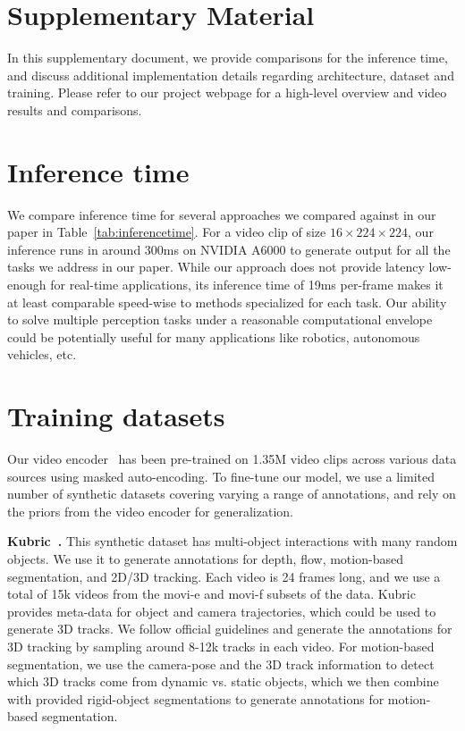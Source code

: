 \clearpage
\section*{\huge Supplementary Material}
\setcounter{page}{1}
\setcounter{section}{0}
\setcounter{table}{0}

In this supplementary document, we provide comparisons for the inference time, and discuss additional implementation details regarding architecture, dataset and training.
Please refer to our project webpage for a high-level overview and video results and comparisons.

\section{Inference time}
We compare inference time for several approaches we compared against in our paper in Table~\ref{tab:inferencetime}.
For a video clip of size $16\times224\times224$, our inference runs in around 300ms on NVIDIA A6000 to generate output for all the tasks we address in our paper.
While our approach does not provide latency low-enough for real-time applications, its inference time of 19ms per-frame makes it at least comparable speed-wise to methods specialized for each task.
Our ability to solve multiple perception tasks under a reasonable computational envelope could be potentially useful for many applications like robotics, autonomous vehicles, etc.

\section{Training datasets}
Our video encoder~\cite{wang2023videomaev2} has been pre-trained on 1.35M video clips across various data sources using masked auto-encoding.
To fine-tune our model, we use a limited number of synthetic datasets covering varying a range of annotations, and rely on the priors from the video encoder for generalization.

\noindent
\textbf{Kubric~\cite{greff2022kubric}.}
This synthetic dataset has multi-object interactions with many random objects.
We use it to generate annotations for depth, flow, motion-based segmentation, and 2D/3D tracking.
Each video is 24 frames long, and we use a total of 15k videos from the movi-e and movi-f subsets of the data.
Kubric provides meta-data for object and camera trajectories, which could be used to generate 3D tracks.
We follow official guidelines and generate the annotations for 3D tracking by sampling around 8-12k tracks in each video.
For motion-based segmentation, we use the camera-pose and the 3D track information to detect which 3D tracks come from dynamic vs. static objects, which we then combine with provided rigid-object segmentations to generate annotations for motion-based segmentation.

